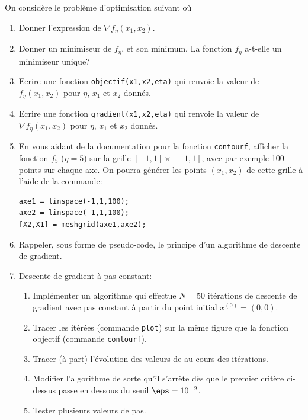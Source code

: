 \documentclass{article}
\begin{document}
On considère le problème d'optimisation suivant
où
\begin{enumerate}
	\item Donner l'expression de $\nabla f_\eta(x_1,x_2)$.
	\item Donner un minimiseur de $f_\eta$, et son minimum. La fonction $f_\eta$ a-t-elle un minimiseur unique?
	\item Ecrire une fonction \texttt{objectif(x1,x2,eta)} qui renvoie la valeur de $f_\eta(x_1,x_2)$ pour $\eta$, $x_1$ et $x_2$ donnés.
	\item Ecrire une fonction \texttt{gradient(x1,x2,eta)} qui renvoie la valeur de $\nabla f_\eta(x_1,x_2)$ pour $\eta$, $x_1$ et $x_2$ donnés.
	\item En vous aidant de la documentation pour la fonction \texttt{contourf}, afficher la fonction $f_5$ ($\eta = 5$) sur la grille $[-1, 1] \times [-1, 1]$, avec par exemple 100 points sur chaque axe. On pourra générer les points $(x_1,x_2)$ de cette grille à l'aide de la commande:
\begin{lstlisting}
axe1 = linspace(-1,1,100);
axe2 = linspace(-1,1,100);
[X2,X1] = meshgrid(axe1,axe2);
\end{lstlisting}
	\item Rappeler, sous forme de pseudo-code, le principe d'un algorithme de descente de gradient.
	\item Descente de gradient à pas constant:
	\begin{enumerate}
		\item Implémenter un algorithme qui effectue $N=50$ itérations de descente de gradient avec pas constant à partir du point initial $x^{(0)} = (0,0)$.
		\item Tracer les itérées (commande \texttt{plot}) sur la même figure que la fonction objectif (commande \texttt{contourf}).
		\item Tracer (à part) l'évolution des valeurs de
		au cours des itérations.
		\item Modifier l'algorithme de sorte qu'il s'arrête dès que le premier critère ci-dessus passe en dessous du seuil $\eps = 10^{-2}$.
		\item Tester plusieurs valeurs de pas.
	\end{enumerate}
\end{enumerate}
\end{document}
